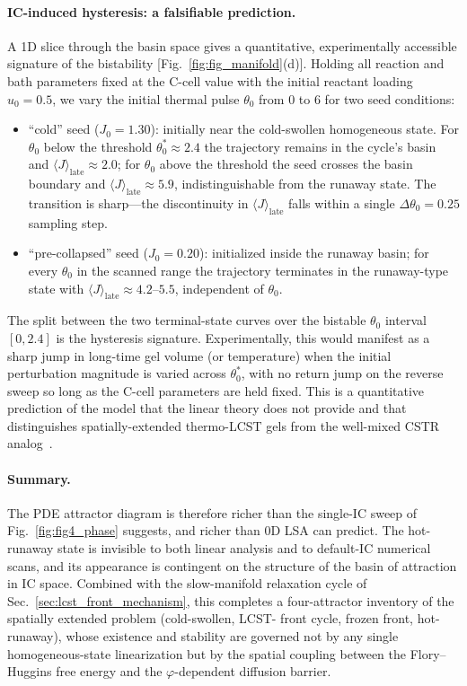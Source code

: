 \paragraph{IC-induced hysteresis: a falsifiable prediction.}
A 1D slice through the basin space gives a quantitative,
experimentally accessible signature of the bistability
[Fig.~\ref{fig:fig_manifold}(d)].  Holding all reaction and bath
parameters fixed at the C-cell value with the initial reactant
loading $u_0=0.5$, we vary the initial thermal pulse $\theta_0$ from
$0$ to $6$ for two seed conditions:
\begin{itemize}
\item ``cold'' seed ($J_0=1.30$): initially near the cold-swollen
  homogeneous state.  For $\theta_0$ below the threshold
  $\theta_0^{\!*}\!\approx\!2.4$ the trajectory remains in the
  cycle's basin and
  $\langle J\rangle_\mathrm{late}\!\approx\!2.0$;
  for $\theta_0$ above the threshold the seed crosses the basin
  boundary and
  $\langle J\rangle_\mathrm{late}\!\approx\!5.9$,
  indistinguishable from the runaway state.  The transition is
  sharp—the discontinuity in $\langle J\rangle_\mathrm{late}$ falls
  within a single $\Delta\theta_0=0.25$ sampling step.
\item ``pre-collapsed'' seed ($J_0=0.20$): initialized inside the
  runaway basin; for every $\theta_0$ in the scanned range the
  trajectory terminates in the runaway-type state with
  $\langle J\rangle_\mathrm{late}\!\approx\!4.2\text{--}5.5$,
  independent of $\theta_0$.
\end{itemize}
The split between the two terminal-state curves over the bistable
$\theta_0$ interval $[0, 2.4]$ is the hysteresis signature.
Experimentally, this would manifest as a sharp jump in long-time
gel volume (or temperature) when the initial perturbation magnitude
is varied across $\theta_0^{\!*}$, with no return jump on the
reverse sweep so long as the C-cell parameters are held fixed.
This is a quantitative prediction of the model that the linear
theory does not provide and that distinguishes spatially-extended
thermo-LCST gels from the well-mixed CSTR
analog~\cite{Uppal1974}.

\paragraph{Summary.}
The PDE attractor diagram is therefore richer than the single-IC
sweep of Fig.~\ref{fig:fig4_phase} suggests, and richer than 0D LSA
can predict.  The hot-runaway state is invisible to both linear
analysis and to default-IC numerical scans, and its appearance is
contingent on the structure of the basin of attraction in IC space.
Combined with the slow-manifold relaxation cycle of
Sec.~\ref{sec:lcst_front_mechanism}, this completes a four-attractor
inventory of the spatially extended problem (cold-swollen, LCST-
front cycle, frozen front, hot-runaway), whose existence and
stability are governed not by any single homogeneous-state
linearization but by the spatial coupling between the Flory--Huggins
free energy and the $\varphi$-dependent diffusion barrier.
